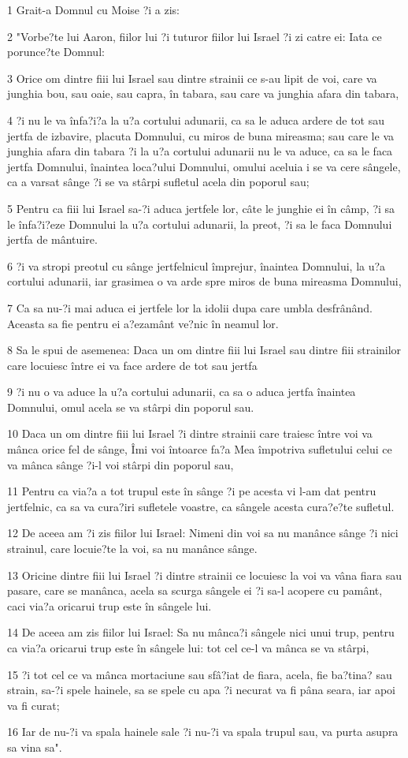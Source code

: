 \par 1 Grait-a Domnul cu Moise ?i a zis:
\par 2 "Vorbe?te lui Aaron, fiilor lui ?i tuturor fiilor lui Israel ?i zi catre ei: Iata ce porunce?te Domnul:
\par 3 Orice om dintre fiii lui Israel sau dintre strainii ce s-au lipit de voi, care va junghia bou, sau oaie, sau capra, în tabara, sau care va junghia afara din tabara,
\par 4 ?i nu le va înfa?i?a la u?a cortului adunarii, ca sa le aduca ardere de tot sau jertfa de izbavire, placuta Domnului, cu miros de buna mireasma; sau care le va junghia afara din tabara ?i la u?a cortului adunarii nu le va aduce, ca sa le faca jertfa Domnului, înaintea loca?ului Domnului, omului aceluia i se va cere sângele, ca a varsat sânge ?i se va stârpi sufletul acela din poporul sau;
\par 5 Pentru ca fiii lui Israel sa-?i aduca jertfele lor, câte le junghie ei în câmp, ?i sa le înfa?i?eze Domnului la u?a cortului adunarii, la preot, ?i sa le faca Domnului jertfa de mântuire.
\par 6 ?i va stropi preotul cu sânge jertfelnicul împrejur, înaintea Domnului, la u?a cortului adunarii, iar grasimea o va arde spre miros de buna mireasma Domnului,
\par 7 Ca sa nu-?i mai aduca ei jertfele lor la idolii dupa care umbla desfrânând. Aceasta sa fie pentru ei a?ezamânt ve?nic în neamul lor.
\par 8 Sa le spui de asemenea: Daca un om dintre fiii lui Israel sau dintre fiii strainilor care locuiesc între ei va face ardere de tot sau jertfa
\par 9 ?i nu o va aduce la u?a cortului adunarii, ca sa o aduca jertfa înaintea Domnului, omul acela se va stârpi din poporul sau.
\par 10 Daca un om dintre fiii lui Israel ?i dintre strainii care traiesc între voi va mânca orice fel de sânge, Îmi voi întoarce fa?a Mea împotriva sufletului celui ce va mânca sânge ?i-l voi stârpi din poporul sau,
\par 11 Pentru ca via?a a tot trupul este în sânge ?i pe acesta vi l-am dat pentru jertfelnic, ca sa va cura?iri sufletele voastre, ca sângele acesta cura?e?te sufletul.
\par 12 De aceea am ?i zis fiilor lui Israel: Nimeni din voi sa nu manânce sânge ?i nici strainul, care locuie?te la voi, sa nu manânce sânge.
\par 13 Oricine dintre fiii lui Israel ?i dintre strainii ce locuiesc la voi va vâna fiara sau pasare, care se manânca, acela sa scurga sângele ei ?i sa-l acopere cu pamânt, caci via?a oricarui trup este în sângele lui.
\par 14 De aceea am zis fiilor lui Israel: Sa nu mânca?i sângele nici unui trup, pentru ca via?a oricarui trup este în sângele lui: tot cel ce-l va mânca se va stârpi,
\par 15 ?i tot cel ce va mânca mortaciune sau sfâ?iat de fiara, acela, fie ba?tina? sau strain, sa-?i spele hainele, sa se spele cu apa ?i necurat va fi pâna seara, iar apoi va fi curat;
\par 16 Iar de nu-?i va spala hainele sale ?i nu-?i va spala trupul sau, va purta asupra sa vina sa".

